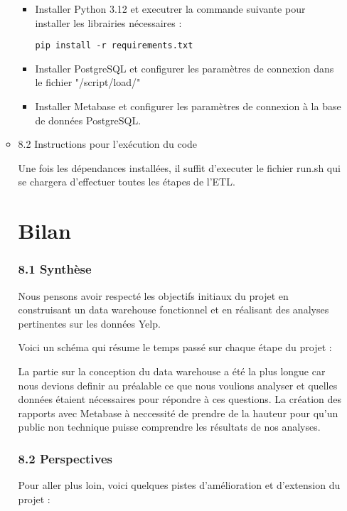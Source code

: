 \begin{itemize}
\begin{itemize}
\begin{itemize}
\item Installer Python 3.12 et executrer la commande suivante pour installer les librairies nécessaires :

\begin{verbatim}
pip install -r requirements.txt
\end{verbatim}

\item Installer PostgreSQL et configurer les paramètres de connexion dans le fichier "/script/load/"

\item Installer Metabase et configurer les paramètres de connexion à la base de données PostgreSQL.
\end{itemize}


\item 8.2 Instructions pour l’exécution du code

Une fois les dépendances installées, il suffit d'executer le fichier run.sh qui se chargera d'effectuer toutes les étapes de l'ETL.


\chapter*{Bilan}

\subsection{8.1 Synthèse}

Nous pensons avoir respecté les objectifs initiaux du projet en construisant un data warehouse fonctionnel et en réalisant des analyses pertinentes sur les données Yelp.

Voici un schéma qui résume le temps passé sur chaque étape du projet :


La partie sur la conception du data warehouse a été la plus longue car nous devions definir au préalable ce que nous voulions analyser et quelles données étaient nécessaires pour répondre à ces questions.
La création des rapports avec Metabase à neccessité de prendre de la hauteur pour qu'un public non technique puisse comprendre les résultats de nos analyses.


\subsection{8.2 Perspectives}

Pour aller plus loin, voici quelques pistes d’amélioration et d’extension du projet :


\end{itemize}
\end{itemize}
